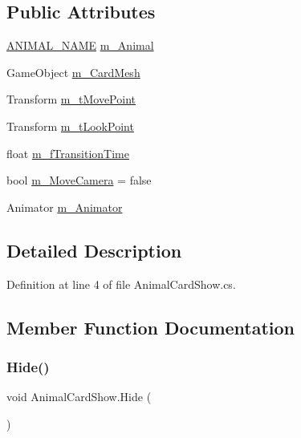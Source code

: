 \subsection*{Public Attributes}
\begin{DoxyCompactItemize}
\item 
\mbox{\hyperlink{_animal_8cs_a2fa5713399b84d1b88dae9196837af50}{A\+N\+I\+M\+A\+L\+\_\+\+N\+A\+ME}} \mbox{\hyperlink{class_animal_card_show_a3dd2cd8c28f6817578e36550365b9e79}{m\+\_\+\+Animal}}
\item 
Game\+Object \mbox{\hyperlink{class_animal_card_show_a3121dd7a61b054a7878e4cdc10d95ffd}{m\+\_\+\+Card\+Mesh}}
\item 
Transform \mbox{\hyperlink{class_animal_card_show_a94fa99e09d57e3ba12a2ee65ade137e0}{m\+\_\+t\+Move\+Point}}
\item 
Transform \mbox{\hyperlink{class_animal_card_show_a189d83cbe969dc8936537e067367308e}{m\+\_\+t\+Look\+Point}}
\item 
float \mbox{\hyperlink{class_animal_card_show_a5ccb006783f602255a65609d4ce39afd}{m\+\_\+f\+Transition\+Time}}
\item 
bool \mbox{\hyperlink{class_animal_card_show_ae4e75ce8b131b9218d7d1362711e6a27}{m\+\_\+\+Move\+Camera}} = false
\item 
Animator \mbox{\hyperlink{class_animal_card_show_a50bb4af7e1242d54cc8c11d909512a40}{m\+\_\+\+Animator}}
\end{DoxyCompactItemize}


\subsection{Detailed Description}


Definition at line 4 of file Animal\+Card\+Show.\+cs.



\subsection{Member Function Documentation}
\mbox{\label{class_animal_card_show_aef559c1b5eaad01d09417ab27da22922}} 
\subsubsection{\texorpdfstring{Hide()}{Hide()}}
{\footnotesize\ttfamily void Animal\+Card\+Show.\+Hide (\begin{DoxyParamCaption}{ }\end{DoxyParamCaption})}



